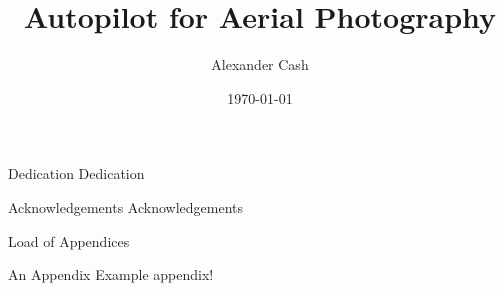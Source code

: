 \documentclass{uoyths}
\begin{document}
\begin{titlepage}[cover=true, title=true, logo=true] 
\title{Autopilot for Aerial Photography}
\author{Alexander Cash}
\date{\today}
\end{titlepage}

\begin{frontMatterEnv}

\begin{chapterEnv}{Dedication}
Dedication
\end{chapterEnv}

\begin{chapterEnv}{Acknowledgements}
Acknowledgements
\end{chapterEnv}



{\singlespacing\tableofcontents}%

\listoffigures

\listoftables

\end{frontMatterEnv}


\begin{mainMatterEnv}











\end{mainMatterEnv}

\begin{backMatterEnv}


\printglossaries

\printbibliography

        \begin{chapterEnv}{Load of Appendices}
            \begin{sectionEnv}{An Appendix}
                Example appendix!
            \end{sectionEnv}
        \end{chapterEnv}


\end{backMatterEnv}
\end{document}
